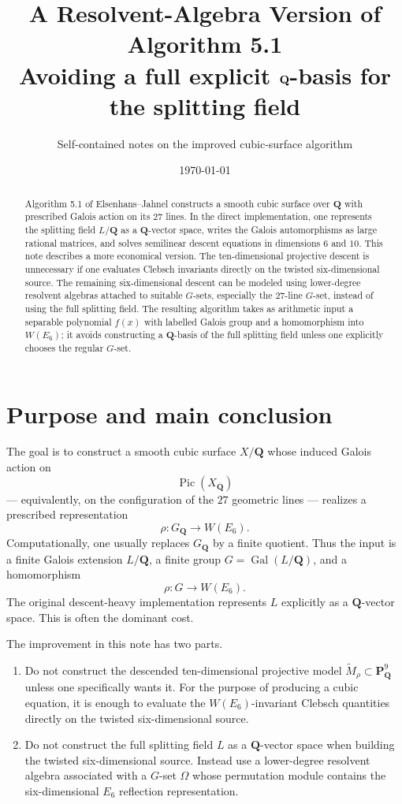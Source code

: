 \documentclass[11pt]{article}
\title{A Resolvent-Algebra Version of Algorithm 5.1\\
\large Avoiding a full explicit $\QQ$-basis for the splitting field}
\author{Self-contained notes on the improved cubic-surface algorithm}
\date{\today}
\newcommand{\QQ}{\mathbf{Q}}
\newcommand{\PP}{\mathbf{P}}
\newcommand{\ol}[1]{\overline{#1}}
\newcommand{\Gal}{\operatorname{Gal}}
\newcommand{\Pic}{\operatorname{Pic}}
\newcommand{\tM}{\widetilde{M}}
\newcommand{\W}{W(E_6)}
\begin{document}
\maketitle

\begin{abstract}
Algorithm 5.1 of Elsenhans--Jahnel constructs a smooth cubic surface over
$\QQ$ with prescribed Galois action on its $27$ lines.  In the direct
implementation, one represents the splitting field $L/\QQ$ as a
$\QQ$-vector space, writes the Galois automorphisms as large rational
matrices, and solves semilinear descent equations in dimensions $6$ and
$10$.  This note describes a more economical version.  The ten-dimensional
projective descent is unnecessary if one evaluates Clebsch invariants directly
on the twisted six-dimensional source.  The remaining six-dimensional descent
can be modeled using lower-degree resolvent algebras attached to suitable
$G$-sets, especially the $27$-line $G$-set, instead of using the full splitting
field.  The resulting algorithm takes as arithmetic input a separable
polynomial $f(x)$ with labelled Galois group and a homomorphism into
$W(E_6)$; it avoids constructing a $\QQ$-basis of the full splitting field
unless one explicitly chooses the regular $G$-set.
\end{abstract}

\tableofcontents

\section{Purpose and main conclusion}

The goal is to construct a smooth cubic surface $X/\QQ$ whose induced Galois
action on
\[
  \Pic(X_{\ol\QQ})
\]
--- equivalently, on the configuration of the $27$ geometric lines --- realizes a
prescribed representation
\[
  \rho:G_{\QQ}\longrightarrow \W.
\]
Computationally, one usually replaces $G_{\QQ}$ by a finite quotient.  Thus the
input is a finite Galois extension $L/\QQ$, a finite group
$G=\Gal(L/\QQ)$, and a homomorphism
\[
  \rho:G\longrightarrow \W.
\]
The original descent-heavy implementation represents $L$ explicitly as a
$\QQ$-vector space.  This is often the dominant cost.

The improvement in this note has two parts.

\begin{enumerate}[label=\textbf{Improvement \arabic*.}]
\item Do not construct the descended ten-dimensional projective model
$\tM_\rho\subset \PP^9_\QQ$ unless one specifically wants it.  For the purpose of
producing a cubic equation, it is enough to evaluate the $W(E_6)$-invariant
Clebsch quantities directly on the twisted six-dimensional source.
\item Do not construct the full splitting field $L$ as a $\QQ$-vector space when
building the twisted six-dimensional source.  Instead use a lower-degree
resolvent algebra associated with a $G$-set $\Omega$ whose permutation module
contains the six-dimensional $E_6$ reflection representation.
\end{enumerate}
\end{document}
